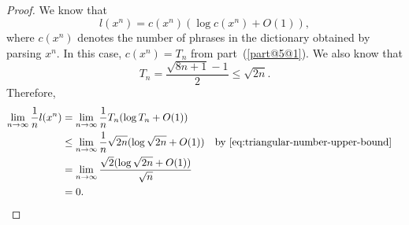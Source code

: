 \documentclass[
  coursecode={MTHE 477},
  assignmentname={Homework \homeworknumber},
  studentnumber=20053722,
  name={Bryan Hoang},
  draft,
]{
  ltxanswer%
}
\begin{document}
\begin{questions}
\begin{parts}
      \part{}
      \begin{solution}
        \begin{proof}
          We know that
          \begin{equation*}
            l(x^{n}) = c(x^{n}) (\log c(x^{n}) + O(1)),
          \end{equation*}
          where \(c(x^{n})\) denotes the number of phrases in the dictionary obtained by parsing \(x^{n}\). In this case, \(c(x^{n})=T_{n}\) from part~(\ref{part@5@1}). We also know that
          \begin{equation}\label{eq:triangular-number-upper-bound}
            T_{n} = \frac{\sqrt{8n + 1} - 1}{2} \le \sqrt{2n}.
          \end{equation}
          Therefore,
          \begin{align*}
            \lim_{n\to\infty} \frac{1}{n} l(x^{n}) &= \lim_{n\to\infty} \frac{1}{n} T_{n} (\log T_{n} + O(1))                                                                   \\
                                                   &\le \lim_{n\to\infty} \frac{1}{n} \sqrt{2n} (\log \sqrt{2n} + O(1))   & &\text{by~\eqref{eq:triangular-number-upper-bound}} \\
                                                   &= \lim_{n\to\infty} \frac{\sqrt{2} (\log \sqrt{2n} + O(1))}{\sqrt{n}}                                                       \\
                                                   &= 0.
          \end{align*}
        \end{proof}
      \end{solution}
    \end{parts}
  \end{questions}
\end{document}
